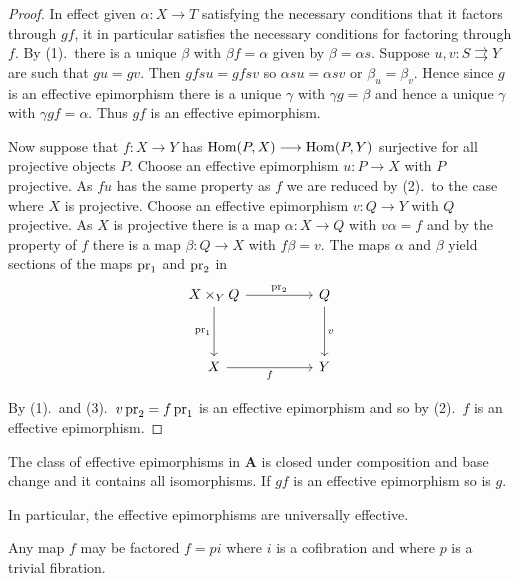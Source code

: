 \documentclass[../main]{subfiles}
\begin{document}
\begin{proof}
In effect given $\alpha \colon X \longrightarrow T$ satisfying the necessary conditions that it factors through $gf$, it in particular satisfies the necessary conditions for factoring through $f$. By (1).\ there is a unique $\beta$ with $\beta f = \alpha$ given by $\beta = \alpha s$. Suppose $u, v \colon S \rightrightarrows Y$ are such that $gu = gv$. Then $gfsu = gfsv$ so $\alpha {su} = \alpha {sv}$ or $\beta_u = \beta_v$. Hence since $g$ is an effective epimorphism there is a unique $\gamma$ with $\gamma g = \beta$ and hence a unique $\gamma$ with $\gamma gf = \alpha$. Thus $gf$ is an effective epimorphism.

Now suppose that $f \colon X \longrightarrow Y$ has $\operatorname{Hom}(P, X) \longrightarrow \operatorname{Hom}(P, Y)$ surjective for all projective objects $P$. Choose an effective epimorphism $u \colon P \longrightarrow X$ with $P$ projective. As $fu$ has the same property as $f$ we are reduced by (2).\ to the case where $X$ is projective. Choose an effective epimorphism $v \colon Q \longrightarrow Y$ with $Q$ projective. As $X$ is projective there is a map $\alpha \colon X \longrightarrow Q$ with $v\alpha = f$ and by the property of $f$ there is a map $\beta \colon Q \longrightarrow X$ with $f \beta = v$. The maps $\alpha$ and $\beta$ yield sections of the maps $\operatorname{pr}_1$ and $\operatorname{pr}_2$ in 
\[
\begin{tikzcd}
    X \times_Y Q
    \arrow[dd, "\pr_1"']
    \arrow[rr, "\pr_2"]
    &&
    Q
    \arrow[dd, "v"]
    \\\\
    X
    \arrow[rr, "f"']
    &&
    Y
\end{tikzcd}
\]

By (1).\ and (3).\ $v\operatorname{pr}_2 = f\operatorname{pr}_1$ is an effective epimorphism and so by (2).\ $f$ is an effective epimorphism. 
\end{proof}

\begin{corollary*}
The class of effective epimorphisms in $\mathbf{A}$ is closed under composition and base change and it contains all isomorphisms. If $gf$ is an effective epimorphism so is $g$. 
\end{corollary*}

In particular, the effective epimorphisms are universally effective.

\begin{proposition}
\label{prop:2.4.03}
Any map $f$ may be factored $f = pi$ where $i$ is a cofibration and where $p$ is a trivial fibration. 
\end{proposition}
\end{document}

